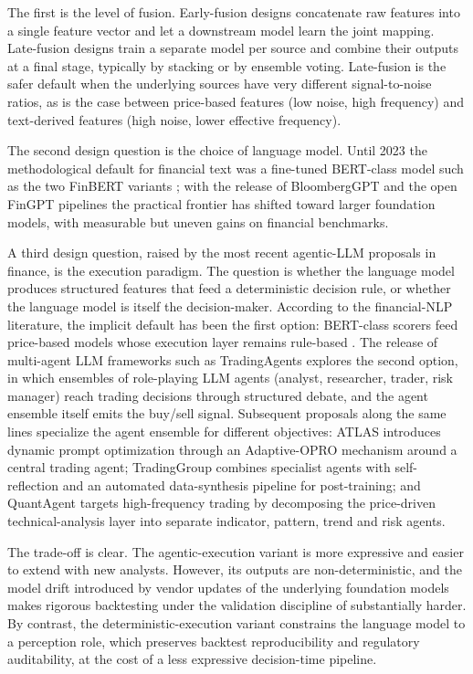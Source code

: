 The first is the level of fusion. Early-fusion designs concatenate raw features into a single feature vector and let a downstream model learn the joint mapping. Late-fusion designs train a separate model per source and combine their outputs at a final stage, typically by stacking or by ensemble voting. Late-fusion is the safer default when the underlying sources have very different signal-to-noise ratios, as is the case between price-based features (low noise, high frequency) and text-derived features (high noise, lower effective frequency).

The second design question is the choice of language model. Until 2023 the methodological default for financial text was a fine-tuned BERT-class model such as the two FinBERT variants \cite{araci2019finbert,yang2020finbert}; with the release of BloombergGPT \cite{wu2023bloomberggpt} and the open FinGPT pipelines \cite{liu2023fingpt} the practical frontier has shifted toward larger foundation models, with measurable but uneven gains on financial benchmarks.

A third design question, raised by the most recent agentic-LLM proposals in finance, is the execution paradigm. The question is whether the language model produces structured features that feed a deterministic decision rule, or whether the language model is itself the decision-maker. According to the financial-NLP literature, the implicit default has been the first option: BERT-class scorers feed price-based models whose execution layer remains rule-based \cite{tetlock2007giving,loughran2011liability}. The release of multi-agent LLM frameworks such as TradingAgents \cite{xiao2024tradingagents} explores the second option, in which ensembles of role-playing LLM agents (analyst, researcher, trader, risk manager) reach trading decisions through structured debate, and the agent ensemble itself emits the buy/sell signal. Subsequent proposals along the same lines specialize the agent ensemble for different objectives: ATLAS \cite{papadakis2025atlas} introduces dynamic prompt optimization through an Adaptive-OPRO mechanism around a central trading agent; TradingGroup \cite{tian2025tradinggroup} combines specialist agents with self-reflection and an automated data-synthesis pipeline for post-training; and QuantAgent \cite{xiong2025quantagent} targets high-frequency trading by decomposing the price-driven technical-analysis layer into separate indicator, pattern, trend and risk agents.

The trade-off is clear. The agentic-execution variant is more expressive and easier to extend with new analysts. However, its outputs are non-deterministic, and the model drift introduced by vendor updates of the underlying foundation models makes rigorous backtesting under the validation discipline of  substantially harder. By contrast, the deterministic-execution variant constrains the language model to a perception role, which preserves backtest reproducibility and regulatory auditability, at the cost of a less expressive decision-time pipeline.

